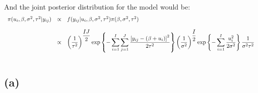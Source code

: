 \documentclass{article}
\begin{document}
And the joint posterior distribution for the model would be:
\begin{equation*}
\begin{array}{lcl ll }
\pi(u_i,\beta, \sigma^2, \tau^2|y_{ij}) & \propto & f(y_{ij}|u_i,\beta, \sigma^2, \tau^2) \pi(\beta,\sigma^2, \tau^2)\\ \\

& \propto & \left(\dfrac{1}{\tau^2}\right)^{\dfrac{IJ}{2}} \mbox{exp}\left\{ - \displaystyle\sum_{i=1}^{I}\sum_{j=1}^{J}\frac{\left[ y_{ij} - (\beta + u_i) \right]^2}{2\tau^2} \right\} \left(\dfrac{1}{\sigma^2}\right)^{\dfrac{I}{2}} \mbox{exp}\left\{ - \displaystyle\sum_{i=1}^{I} \dfrac{u_i^2}{2\sigma^2} \right\} \dfrac{1}{\sigma^2\tau^2} \\\\
 \end{array}
\end{equation*}

\subsection{(a)}
\end{document}

